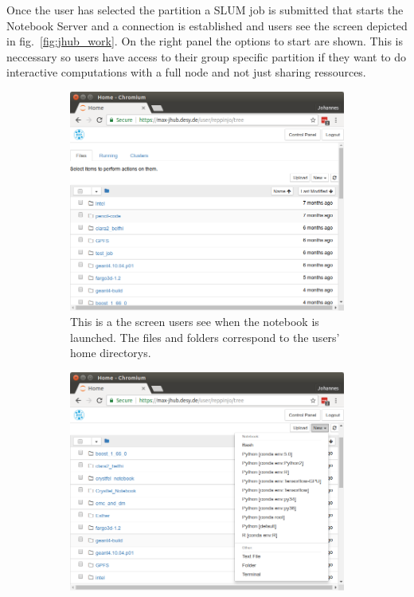 \documentclass[10pt]{scrartcl}
\begin{document}
Once the user has selected the partition a SLUM job is submitted that starts the Notebook Server and a connection is established and users see the screen depicted in fig.~\ref{fig:jhub_work}. On the right panel the options to start are shown. This is neccessary so users have access to their group specific partition if they want to do interactive computations with a full node and not just sharing ressources.

\begin{figure}
  \centering
    \begin{subfigure}{0.45\textwidth} %
	  \includegraphics[width=\textwidth]{figures/jhub006.png}
	  \caption{This is a the screen users see when the notebook is launched. The files and folders correspond to the users' home directorys.} %
  \end{subfigure}
  \vspace{1em} %
  \begin{subfigure}{0.45\textwidth} %
	  \includegraphics[width=\textwidth]{figures/jhub007.png}

\end{subfigure}
\end{figure}
\end{document}
